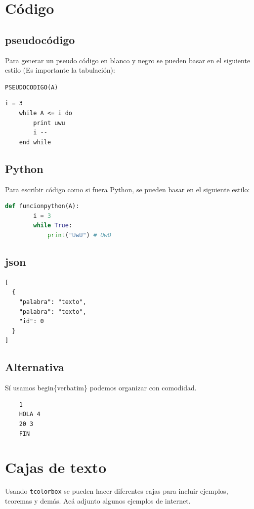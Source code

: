 \newpage
\section{Código}
\subsection{pseudocódigo}
Para generar un pseudo código en blanco y negro se pueden basar en el siguiente estilo (Es importante la tabulación):

\texttt{PSEUDOCODIGO(A)} %
\begin{lstlisting}[style=blancoynegro]
    i = 3
    while A <= i do
        print uwu
        i --
    end while
\end{lstlisting}

\subsection{Python}
Para escribir código como si fuera Python, se pueden basar en el siguiente estilo:
\begin{lstlisting}[language=Python, style=stylepython]
    def funcionpython(A):
        i = 3
        while True:
            print("UwU") # OwO
\end{lstlisting}

\subsection{json}
\begin{verbatim} 
[
  {
    "palabra": "texto",
    "palabra": "texto",
    "id": 0
  }
]
\end{verbatim}

\subsection{Alternativa}
Sí usamos begin\{verbatim\} podemos organizar con comodidad.
\begin{verbatim}
    1
    HOLA 4
    20 3
    FIN
\end{verbatim}


\newpage
\section{Cajas de texto}
Usando \texttt{tcolorbox} se pueden hacer diferentes cajas para incluir ejemplos, teoremas y demás. Acá adjunto algunos ejemplos de internet.

